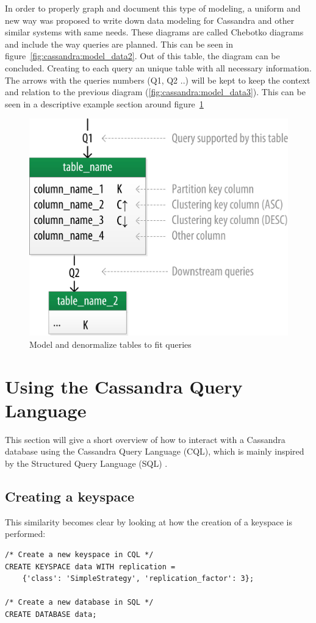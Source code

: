 In order to properly graph and document this type of modeling, a uniform and new way was proposed to write down data modeling for Cassandra and other similar systems with same needs. \autocite{chebotko2015data}
These diagrams are called Chebotko diagrams and include the way queries are planned. This can be seen in figure~\ref{fig:cassandra:model_data2}.
Out of this table, the diagram can be concluded. Creating to each query an unique table with all necessary information. The arrows with the queries numbers (Q1, Q2 ..) will be kept to keep the context and relation to the previous diagram (\ref{fig:cassandra:model_data3}).
This can be seen in a descriptive example section around figure~\ref{fig:cassandra:chebotko}

\begin{figure}[H]
    \centering
    \includegraphics[width=0.75\columnwidth]{img/model_example_primary_key.jpeg}
    \caption{Model and denormalize tables to fit queries \autocite{cassandra_oreilly}}
    \label{fig:cassandra:chebotko}
\end{figure}

\section{Using the Cassandra Query Language} \label{sec:cassandra:cql} %
This section will give a short overview of how to interact with a Cassandra database using the Cassandra Query Language (CQL), which is mainly inspired by the Structured Query Language (SQL) \autocite{cqlAlexMeng, newInCQL3, cassandra3cqldocCreateKeystore}.

\subsection {Creating a keyspace}
This similarity becomes clear by looking at how the creation of a keyspace is performed:
\begin{verbatim}
/* Create a new keyspace in CQL */
CREATE KEYSPACE data WITH replication =
    {'class': 'SimpleStrategy', 'replication_factor': 3};

/* Create a new database in SQL */
CREATE DATABASE data;
\end{verbatim}

